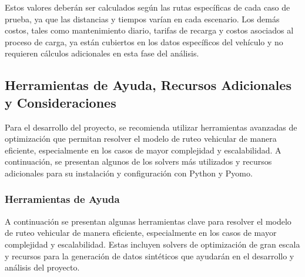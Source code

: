 \documentclass[12pt]{article}
\begin{document}
Estos valores deberán ser calculados según las rutas específicas de cada caso de prueba, ya que las distancias y tiempos varían en cada escenario. Los demás costos, tales como mantenimiento diario, tarifas de recarga y costos asociados al proceso de carga, ya están cubiertos en los datos específicos del vehículo y no requieren cálculos adicionales en esta fase del análisis.

\subsection{Herramientas de Ayuda, Recursos Adicionales y Consideraciones}

Para el desarrollo del proyecto, se recomienda utilizar herramientas avanzadas de optimización que permitan resolver el modelo de ruteo vehicular de manera eficiente, especialmente en los casos de mayor complejidad y escalabilidad. A continuación, se presentan algunos de los solvers más utilizados y recursos adicionales para su instalación y configuración con Python y Pyomo.

\subsubsection{Herramientas de Ayuda}

A continuación se presentan algunas herramientas clave para resolver el modelo de ruteo vehicular de manera eficiente, especialmente en los casos de mayor complejidad y escalabilidad. Estas incluyen solvers de optimización de gran escala y recursos para la generación de datos sintéticos que ayudarán en el desarrollo y análisis del proyecto.
\end{document}
